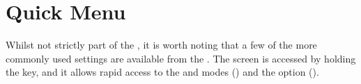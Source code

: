 {
\section{Quick Menu}
  Whilst not strictly part of the , it is worth noting that a few
  of the more commonly used settings are available from the .
  The  screen is accessed by holding the 
  {} key, and it allows rapid access to the  and  modes 
  ()
  and the  option ().
}
